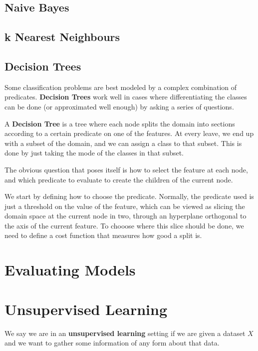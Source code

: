 \documentclass{article}
\begin{document}
\subsection{Naive Bayes}

\subsection{k Nearest Neighbours}

\subsection{Decision Trees}

Some classification problems are best modeled by a complex combination of predicates.
\textbf{Decision Trees} work well in cases where differentiating the classes can be done (or approximated well enough) by asking a series of questions.

A \textbf{Decision Tree} is a tree where each node splits the domain into sections according to a certain predicate on one of the features.
At every leave, we end up with a subset of the domain, and we can assign a class to that subset.
This is done by just taking the mode of the classes in that subset.

The obvious question that poses itself is how to select the feature at each node, and which predicate to evaluate to create the children of the current node.

We start by defining how to choose the predicate.
Normally, the predicate used is just a threshold on the value of the feature, which can be viewed as slicing the domain space at the current node in two, through an hyperplane orthogonal to the axis of the current feature.
To chooose where this slice should be done, we need to define a cost function that measures how good a split is.

\section{Evaluating Models}

\section{Unsupervised Learning}

We say we are in an \textbf{unsupervised learning} setting if we are given a dataset $X$ and we want to gather some information of any form about that data.
\end{document}
